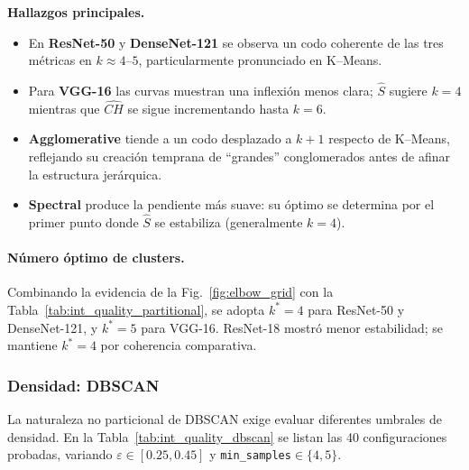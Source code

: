 \vspace{1ex}
\noindent\textbf{Hallazgos principales.}
\begin{itemize}
  \item En \textbf{ResNet-50} y \textbf{DenseNet-121} se observa un codo
        coherente de las tres métricas en \(k\approx4\)–\(5\),
        particularmente pronunciado en K–Means.
  \item Para \textbf{VGG-16} las curvas muestran una inflexión menos clara;
        \(\widehat S\) sugiere \(k=4\) mientras que \(\widehat{CH}\) se sigue
        incrementando hasta \(k=6\).
  \item \textbf{Agglomerative} tiende a un codo desplazado a
        \(k+1\) respecto de K–Means, reflejando su creación temprana de
        “grandes” conglomerados antes de afinar la estructura jerárquica.
  \item \textbf{Spectral} produce la pendiente más suave: su óptimo se
        determina por el primer punto donde
        \(\widehat S\) se estabiliza (generalmente \(k=4\)).
\end{itemize}

\vspace{1ex}
\paragraph{Número óptimo de clusters.}
Combinando la evidencia de la Fig.~\ref{fig:elbow_grid} con
la Tabla~\ref{tab:int_quality_partitional}, se adopta \(k^\ast=4\) para
ResNet-50 y DenseNet-121, y \(k^\ast=5\) para VGG-16.
ResNet-18 mostró menor estabilidad; se mantiene \(k^\ast=4\) por coherencia
comparativa.

\subsubsection{Densidad: DBSCAN}

La naturaleza no particional de DBSCAN exige evaluar diferentes umbrales de densidad.
En la Tabla~\ref{tab:int_quality_dbscan} se listan las 40 configuraciones probadas, variando \(\varepsilon\in[0.25,0.45]\) y \texttt{min\_samples}\(\in\{4,5\}\).

